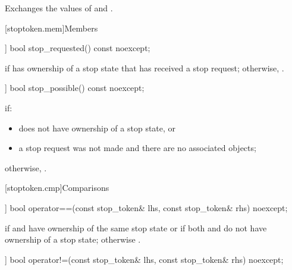 \begin{itemdescr}
\pnum
\effects Exchanges the values of  and .
\end{itemdescr}

[stoptoken.mem]{Members}

%
\begin{itemdecl}
[[nodiscard]] bool stop_requested() const noexcept;
\end{itemdecl}

\begin{itemdescr}
\pnum
\returns {} if  has ownership of a stop state
that has received a stop request;
otherwise, .
\end{itemdescr}

%
\begin{itemdecl}
[[nodiscard]] bool stop_possible() const noexcept;
\end{itemdecl}

\begin{itemdescr}
\pnum
\returns {} if:
\begin{itemize}
\item {} does not have ownership of a stop state, or
\item a stop request was not made
      and there are no associated  objects;
\end{itemize}
otherwise, .
\end{itemdescr}

[stoptoken.cmp]{Comparisons}

%
\begin{itemdecl}
[[nodiscard]] bool operator==(const stop_token& lhs, const stop_token& rhs) noexcept;
\end{itemdecl}

\begin{itemdescr}
\pnum
\returns
{} if  and  have ownership of the same stop state
or if both  and  do not have ownership of a stop state;
otherwise .
\end{itemdescr}

%
\begin{itemdecl}
[[nodiscard]] bool operator!=(const stop_token& lhs, const stop_token& rhs) noexcept;
\end{itemdecl}

